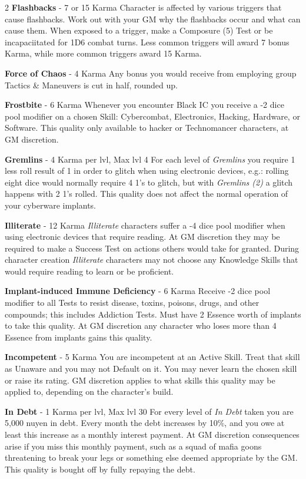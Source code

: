 \documentclass[
  oneside]{article}
\begin{document}
\begin{multicols}{2}
\textbf{Flashbacks} - 7 or 15 Karma Character is
affected by various triggers that cause
flashbacks. Work out with your GM why the
flashbacks occur and what can cause them. When
exposed to a trigger, make a Composure (5) Test or
be incapaciitated for 1D6 combat turns. Less
common triggers will award 7 bonus Karma, while
more common triggers award 15 Karma.

\textbf{Force of Chaos} - 4 Karma Any bonus you
would receive from employing group Tactics \&
Maneuvers is cut in half, rounded up.

\textbf{Frostbite} - 6 Karma Whenever you
encounter Black IC you receive a -2 dice pool
modifier on a chosen Skill: Cybercombat,
Electronics, Hacking, Hardware, or Software. This
quality only available to hacker or Technomancer
characters, at GM discretion.

\textbf{Gremlins} - 4 Karma per lvl, Max lvl 4 For
each level of \emph{Gremlins} you require 1 less
roll result of 1 in order to glitch when using
electronic devices, e.g.: rolling eight dice would
normally require 4 1's to glitch, but with
\emph{Gremlins (2)} a glitch happens with 2 1's
rolled. This quality does not affect the normal
operation of your cyberware implants.

\textbf{Illiterate} - 12 Karma \emph{Illiterate}
characters suffer a -4 dice pool modifier when
using electronic devices that require reading. At
GM discretion they may be required to make a
Success Test on actions others would take for
granted. During character creation
\emph{Illiterate} characters may not choose any
Knowledge Skills that would require reading to
learn or be proficient.

\textbf{Implant-induced Immune Deficiency} - 6
Karma Receive -2 dice pool modifier to all Tests
to resist disease, toxins, poisons, drugs, and
other compounds; this includes Addiction Tests.
Must have 2 Essence worth of implants to take this
quality. At GM discretion any character who loses
more than 4 Essence from implants gains this
quality.

\textbf{Incompetent} - 5 Karma You are incompetent
at an Active Skill. Treat that skill as Unaware
and you may not Default on it. You may never learn
the chosen skill or raise its rating. GM
discretion applies to what skills this quality may
be applied to, depending on the character's build.

\textbf{In Debt} - 1 Karma per lvl, Max lvl 30 For
every level of \emph{In Debt} taken you are 5,000
nuyen in debt. Every month the debt increases by
10\%, and you owe at least this increase as a
monthly interest payment. At GM discretion
consequences arise if you miss this monthly
payment, such as a squad of mafia goons
threatening to break your legs or something else
deemed appropriate by the GM. This quality is
bought off by fully repaying the debt.


\end{multicols}
\end{document}
